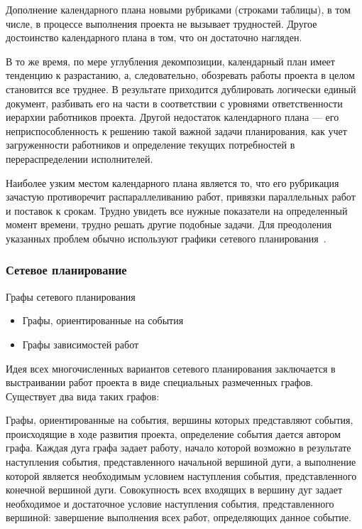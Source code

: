 \documentclass{../industrial-development}
\begin{document}
\lecturenotes

Дополнение календарного плана новыми рубриками (строками таблицы), в том числе, в процессе выполнения проекта не вызывает трудностей. Другое достоинство календарного плана в том, что он достаточно нагляден.

В то же время, по мере углубления декомпозиции, календарный план имеет тенденцию к разрастанию, а, следовательно, обозревать работы проекта в целом становится все труднее. В результате приходится дублировать логически единый документ, разбивать его на части в соответствии с уровнями ответственности иерархии работников проекта. Другой недостаток календарного плана — его неприспособленность к решению такой важной задачи планирования, как учет загруженности работников и определение текущих потребностей в перераспределении исполнителей. 

Наиболее узким местом календарного плана является то, что его рубрикация зачастую противоречит распараллеливанию работ, привязки параллельных работ и поставок к срокам. Трудно увидеть все нужные показатели на определенный момент времени, трудно решать другие подобные задачи. Для преодоления указанных проблем обычно используют графики сетевого планирования~\cite[с.~50]{Skopin}.

\begin{frame} \frametitle{Сетевое планирование}
  \begin{block}{Графы сетевого планирования}
    \begin{itemize}
     \item Графы, ориентированные на события
     \item Графы зависимостей работ
    \end{itemize}
  \end{block}
\end{frame}

\lecturenotes

Идея всех многочисленных вариантов сетевого планирования заключается в выстраивании работ проекта в виде специальных размеченных графов. Существует два вида таких графов:

Графы, ориентированные на события, вершины которых представляют события, происходящие в ходе развития проекта, определение события дается автором графа. Каждая дуга графа задает работу, начало которой возможно в результате наступления события, представленного начальной вершиной дуги, а выполнение которой является необходимым условием наступления события, представленного конечной вершиной дуги. Совокупность всех входящих в вершину дуг задает необходимое и достаточное условие наступления события, представленного вершиной: завершение выполнения всех работ, определяющих данное событие.
\end{document}
